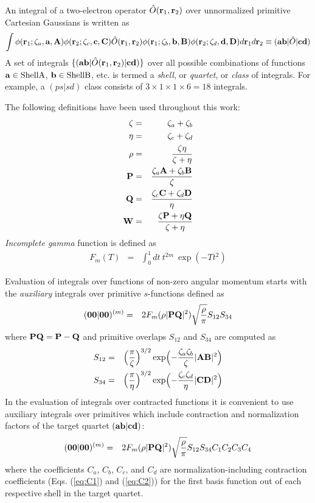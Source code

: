 \documentclass[12pt]{article}
\begin{document}
An integral of a two-electron operator $\hat{O}({\bf r}_1, {\bf r}_2)$ over unnormalized
primitive Cartesian Gaussians is written as
\begin{eqnarray}
\int \phi({\bf r}_1; \zeta_a, {\bf a}, {\bf A}) \phi ({\bf r}_2; \zeta_c, {\bf c}, {\bf C}) \hat{O}({\bf r}_1, {\bf r}_2)
\phi({\bf r}_1; \zeta_b, {\bf b}, {\bf B}) \phi({\bf r}_2; \zeta_d, {\bf d}, {\bf D}) d{\bf r}_1 d{\bf r}_2 \equiv ({\bf ab} |\hat{O}|{\bf cd})
\end{eqnarray}
A set of integrals $\{ ({\bf a} {\bf b}|\hat{O}({\bf r}_1, {\bf r}_2)|{\bf c} {\bf d}) \}$
over all possible combinations of functions ${\bf a} \in {\rm Shell A}$, ${\bf b} \in {\rm Shell B}$, etc.
is termed a {\em shell}, or {\em quartet}, or {\em class} of integrals. For example, a $(ps|sd)$ class consists of
$3 \times 1 \times 1 \times 6 = 18$ integrals.

The following definitions have been used throughout this work:
\begin{eqnarray}
\zeta & = & \zeta_a + \zeta_b \\
\eta  & = & \zeta_c + \zeta_d \\
\rho  & = & \frac{\zeta\eta}{\zeta+\eta} \\
{\bf P}& = & \frac{\zeta_a {\bf A} + \zeta_b {\bf B}}{\zeta} \\
{\bf Q}& = & \frac{\zeta_c {\bf C} + \zeta_d {\bf D}}{\eta} \\
{\bf W}& = & \frac{\zeta {\bf P} + \eta {\bf Q}}{\zeta+\eta}
\end{eqnarray}
{\em Incomplete gamma} function is defined as
\begin{eqnarray}
F_m(T) & = & \int_0^{1} dt\ t^{2m}\ \exp (-Tt^2)
\end{eqnarray}

Evaluation of integrals over functions of non-zero angular momentum starts with the
{\em auxiliary} integrals over primitive $s$-functions
defined as
\begin{eqnarray}
({\bf 00}|{\bf 00})^{(m)} & = & 2 F_m(\rho |{\bf PQ}|^2) \sqrt{\frac{\rho}{\pi}}S_{12}S_{34}
\end{eqnarray}
where ${\bf PQ} = {\bf P} - {\bf Q}$ and primitive overlaps $S_{12}$ and $S_{34}$
are computed as
\begin{eqnarray}
S_{12} & = & \Bigl( \frac{\pi}{\zeta} \Bigr)^{3/2}
\exp \Bigl(-\frac{\zeta_a\zeta_b}{\zeta} |{\bf AB}|^2 \Bigr) \\
S_{34} & = & \Bigl( \frac{\pi}{\eta} \Bigr)^{3/2}
\exp \Bigl(-\frac{\zeta_c\zeta_d}{\eta} |{\bf CD}|^2 \Bigr)
\end{eqnarray}
In the evaluation of integrals over contracted functions it is convenient to
use auxiliary integrals over primitives which include contraction and normalization factors of the
target quartet $({\bf ab}|{\bf cd})$:
\begin{eqnarray} \label{eq:0000m}
({\bf 00}|{\bf 00})^{(m)} & = &  2 F_m(\rho |{\bf PQ}|^2) \sqrt{\frac{\rho}{\pi}}S_{12}S_{34}
C_1 C_2 C_3 C_4
\end{eqnarray}
where the coefficients $C_a$, $C_b$, $C_c$, and $C_d$ are
normalization-including contraction coefficients (Eqs. (\ref{eq:C1})
and (\ref{eq:C2})) for the first basis function out of each respective shell
in the target quartet.
\end{document}
